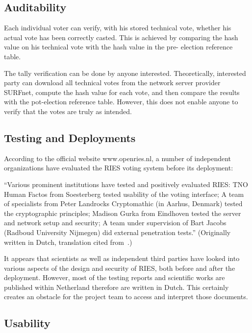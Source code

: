 \subsection{Auditability}

Each individual voter can verify, with his stored technical vote, whether his actual vote has been correctly casted. This is achieved by comparing the hash value on his technical vote with the hash value in the pre- election reference table.

The tally verification can be done by anyone interested. Theoretically, interested party can download all technical votes from the network server provider SURFnet, compute the hash value for each vote, and then compare the results with the pot-election reference table. However, this does not enable anyone to verify that the votes are truly as intended.

\subsection{Testing and Deployments}

According to the official website \textcolor[rgb]{0.078431375,0.3254902,0.6901961}{www.openries.nl, }a number of independent organizations have evaluated the RIES voting system before its deployment:

``Various prominent institutions have tested and positively evaluated RIES: TNO Human Factos from Soesterberg tested usability of the voting interface; A team of specialists from Peter Landrocks Cryptomathic (in Aarhus, Denmark) tested the cryptographic principles; Madison Gurka from Eindhoven tested the server and network setup and security; A team under supervision of Bart Jacobs (Radboud University Nijmegen) did external penetration tests.'' (Originally written in Dutch, translation cited from~\cite{gonggrijp2009}.)

It appears that scientists as well as independent third parties have looked into various aspects of the design and security of RIES, both before and after the deployment. However, most of the testing reports and scientific works are published within Netherland therefore are written in Dutch. This certainly creates an obstacle for the project team to access and interpret those documents.

\subsection{Usability}

